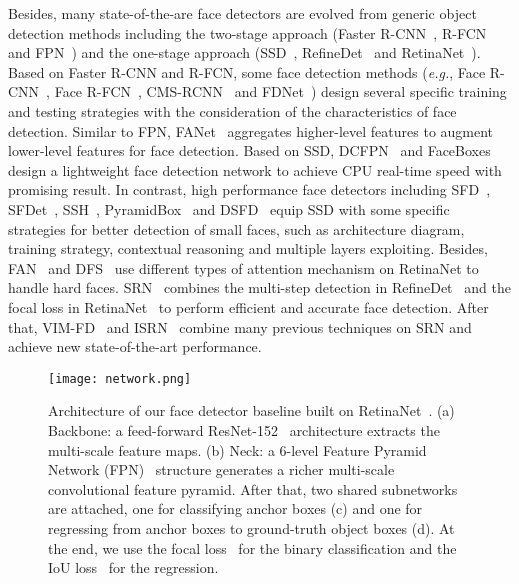 \documentclass{article} \usepackage{nips13submit_e,times}
\def\eg{{\em e.g.}}
\begin{document}
Besides, many state-of-the-are face detectors are evolved from generic object detection methods including the two-stage approach (Faster R-CNN~\cite{DBLP:journals/pami/RenHG017}, R-FCN~\cite{DBLP:conf/nips/DaiLHS16} and FPN~\cite{DBLP:conf/cvpr/LinDGHHB17}) and the one-stage approach (SSD~\cite{DBLP:conf/eccv/LiuAESRFB16}, RefineDet~\cite{DBLP:journals/corr/abs-1711-06897} and RetinaNet~\cite{DBLP:conf/iccv/LinPRK17}). Based on Faster R-CNN and R-FCN, some face detection methods (\eg, Face R-CNN~\cite{DBLP:journals/corr/WangLJW17}, Face R-FCN~\cite{DBLP:journals/corr/abs-1709-05256}, CMS-RCNN~\cite{DBLP:journals/corr/ZhuZLS16} and FDNet~\cite{DBLP:journals/corr/abs-1802-02142}) design several specific training and testing strategies with the consideration of the characteristics of face detection. Similar to FPN, FANet~\cite{DBLP:journals/corr/abs-1712-00721} aggregates higher-level features to augment lower-level features for face detection. Based on SSD, DCFPN~\cite{DBLP:conf/ccbr/ZhangZLSWL17} and FaceBoxes~\cite{DBLP:conf/ijcb/abs-1708-05234} design a lightweight face detection network to achieve CPU real-time speed with promising result. In contrast, high performance face detectors including SFD~\cite{DBLP:conf/iccv/abs-1708-05237}, SFDet~\cite{zhang2019single}, SSH~\cite{DBLP:conf/iccv/NajibiSCD17}, PyramidBox~\cite{tang2018pyramidbox,li2019pyramidbox++} and DSFD~\cite{DBLP:journals/corr/abs-1810-10220} equip SSD with some specific strategies for better detection of small faces, such as architecture diagram, training strategy, contextual reasoning and multiple layers exploiting. Besides, FAN~\cite{wang2017fan} and DFS~\cite{DBLP:journals/corr/abs-1811-08557} use different types of attention mechanism on RetinaNet to handle hard faces. SRN~\cite{DBLP:journals/corr/abs-1809-02693} combines the multi-step detection in RefineDet~\cite{DBLP:journals/corr/abs-1711-06897} and the focal loss in RetinaNet~\cite{DBLP:conf/iccv/LinPRK17} to perform efficient and accurate face detection. After that, VIM-FD~\cite{DBLP:journals/corr/abs-1901-02350} and ISRN~\cite{DBLP:journals/corr/abs-1901-06651} combine many previous techniques on SRN and achieve new state-of-the-art performance.

\begin{figure*}[t!]
\centering
\texttt{[image: network.png]}
\caption{Architecture of our face detector baseline built on RetinaNet~\cite{DBLP:conf/iccv/LinPRK17}. (a) Backbone: a feed-forward ResNet-152~\cite{DBLP:conf/cvpr/HeZRS16} architecture extracts the multi-scale feature maps. (b) Neck: a 6-level Feature Pyramid Network (FPN)~\cite{DBLP:conf/cvpr/LinDGHHB17} structure generates a richer multi-scale convolutional feature pyramid. After that, two shared subnetworks are attached, one for classifying anchor boxes (c) and one for regressing from anchor boxes to ground-truth object boxes (d). At the end, we use the focal loss~\cite{DBLP:conf/iccv/LinPRK17} for the binary classification and the IoU loss~\cite{DBLP:conf/mm/YuJWCH16} for the regression.}
\label{fig:framework}
\end{figure*}
\end{document}
